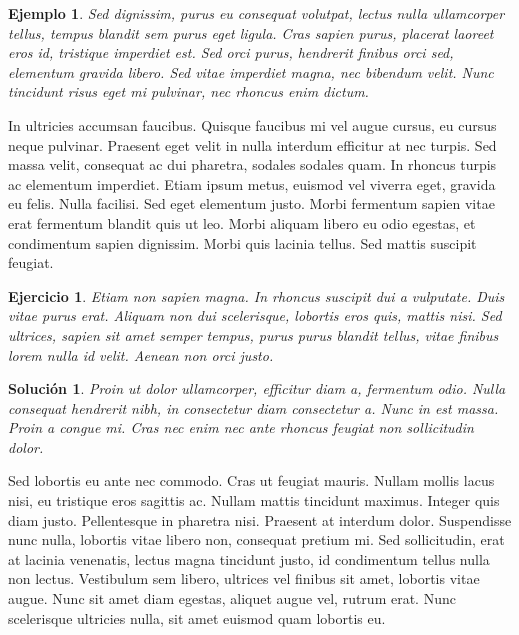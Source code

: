 \documentclass[10pt, a4paper]{article}
\theoremstyle{theorem-style}
\theoremstyle{definition-style}
\theoremstyle{remark-style}
\theoremstyle{example-style}
\newtheorem{ejemplo}{Ejemplo}[section]
\theoremstyle{definition-style}
\newtheorem{ejer}{Ejercicio}[section]
\theoremstyle{remark-style}
\newtheorem*{sol}{Solución}
\begin{document}
\begin{ejemplo}
  Sed dignissim, purus eu consequat volutpat, lectus nulla ullamcorper tellus, tempus blandit sem purus eget ligula. Cras sapien purus, placerat laoreet eros id, tristique imperdiet est. Sed orci purus, hendrerit finibus orci sed, elementum gravida libero. Sed vitae imperdiet magna, nec bibendum velit. Nunc tincidunt risus eget mi pulvinar, nec rhoncus enim dictum.
\end{ejemplo}

In ultricies accumsan faucibus. Quisque faucibus mi vel augue cursus, eu cursus neque pulvinar. Praesent eget velit in nulla interdum efficitur at nec turpis. Sed massa velit\footnotemark, consequat ac dui pharetra, sodales sodales quam. In rhoncus turpis ac elementum imperdiet. Etiam ipsum metus, euismod vel viverra eget, gravida eu felis. Nulla facilisi. Sed eget elementum justo. Morbi fermentum sapien vitae erat fermentum blandit quis ut leo. Morbi aliquam libero eu odio egestas, et condimentum sapien dignissim. Morbi quis lacinia tellus. Sed mattis suscipit feugiat.


\begin{ejer}
  Etiam non sapien magna. In rhoncus suscipit dui a vulputate. Duis vitae purus erat. Aliquam non dui scelerisque, lobortis eros quis, mattis nisi. Sed ultrices, sapien sit amet semper tempus, purus purus blandit tellus, vitae finibus lorem nulla id velit. Aenean non orci justo.
\end{ejer}

\begin{sol}
  Proin ut dolor ullamcorper, efficitur diam a, fermentum odio. Nulla consequat hendrerit nibh, in consectetur diam consectetur a. Nunc in est massa. Proin a congue mi. Cras nec enim nec ante rhoncus feugiat non sollicitudin dolor.
\end{sol}

Sed lobortis eu ante nec commodo. Cras ut feugiat mauris. Nullam mollis lacus nisi, eu tristique eros sagittis ac. Nullam mattis tincidunt maximus. Integer quis diam justo. Pellentesque in pharetra nisi. Praesent at interdum dolor. Suspendisse nunc nulla, lobortis vitae libero non, consequat pretium mi. Sed sollicitudin, erat at lacinia venenatis, lectus magna tincidunt justo, id condimentum tellus nulla non lectus. Vestibulum sem libero, ultrices vel finibus sit amet, lobortis vitae augue. Nunc sit amet diam egestas, aliquet augue vel, rutrum erat. Nunc scelerisque ultricies nulla, sit amet euismod quam lobortis eu.
\end{document}
